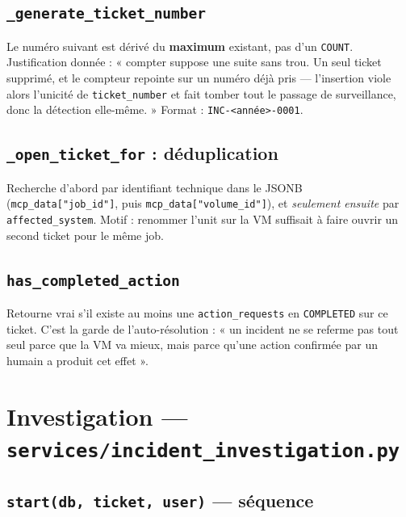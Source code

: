 \documentclass[11pt,a4paper]{report}
\newcommand{\file}[1]{\texttt{\small #1}}
\newcommand{\fn}[1]{\texttt{\small\textcolor{oasisviolet}{#1}}}
\newcommand{\tbl}[1]{\texttt{\small\textcolor{oasisamber}{#1}}}
\begin{document}
\subsection*{\fn{\_generate\_ticket\_number}}
Le numéro suivant est dérivé du \textbf{maximum} existant, pas d'un
\texttt{COUNT}. Justification donnée : « compter suppose une suite sans trou. Un
seul ticket supprimé, et le compteur repointe sur un numéro déjà pris ---
l'insertion viole alors l'unicité de \texttt{ticket\_number} et fait tomber tout
le passage de surveillance, donc la détection elle-même. » Format :
\texttt{INC-<année>-0001}.

\subsection*{\fn{\_open\_ticket\_for} : déduplication}
Recherche d'abord par identifiant technique dans le JSONB
(\texttt{mcp\_data["job\_id"]}, puis \texttt{mcp\_data["volume\_id"]}), et
\emph{seulement ensuite} par \texttt{affected\_system}. Motif : renommer l'unit
sur la VM suffisait à faire ouvrir un second ticket pour le même job.

\subsection*{\fn{has\_completed\_action}}
Retourne vrai s'il existe au moins une \tbl{action\_requests} en
\texttt{COMPLETED} sur ce ticket. C'est la garde de l'auto-résolution : « un
incident ne se referme pas tout seul parce que la VM va mieux, mais parce
qu'une action confirmée par un humain a produit cet effet ».

\section{Investigation --- \file{services/incident\_investigation.py}}

\subsection*{\fn{start(db, ticket, user)} --- séquence}
\end{document}
